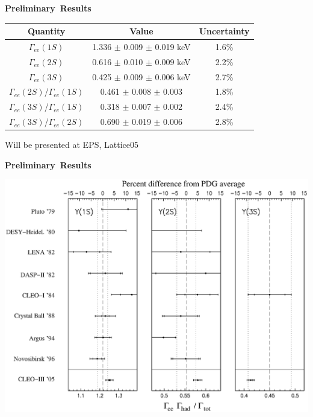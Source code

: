 \documentclass[landscape]{article}
\newenvironment{slide}[1][ ]{\mbox{\bf #1 } \vfill}{\vfill \mbox{ } \pagebreak}
\begin{document}
\begin{slide}[Preliminary Results]
  \begin{center}
    \renewcommand{\arraystretch}{2}
    \begin{tabular}{c c c}
      Quantity & Value & \mbox{\hspace{0.5 cm}} Uncertainty \mbox{\hspace{0.5 cm}} \\ \hline
      $\Gamma_{ee}(1S)$ & \mbox{\hspace{0.5 cm}} 1.336 $\pm$ 0.009 $\pm$ 0.019 keV \mbox{\hspace{0.5 cm}} & 1.6\% \\
      $\Gamma_{ee}(2S)$ & 0.616 $\pm$ 0.010 $\pm$ 0.009 keV & 2.2\% \\
      $\Gamma_{ee}(3S)$ & 0.425 $\pm$ 0.009 $\pm$ 0.006 keV & 2.7\% \\ \hline
      $\Gamma_{ee}(2S)$/$\Gamma_{ee}(1S)$ & 0.461 $\pm$ 0.008 $\pm$ 0.003 & 1.8\% \\
      $\Gamma_{ee}(3S)$/$\Gamma_{ee}(1S)$ & 0.318 $\pm$ 0.007 $\pm$ 0.002 & 2.4\% \\
      $\Gamma_{ee}(3S)$/$\Gamma_{ee}(2S)$ & 0.690 $\pm$ 0.019 $\pm$ 0.006 & 2.8\% \\
    \end{tabular}
  \end{center}

  \vfill
  Will be presented at EPS, Lattice05
\end{slide}

\begin{slide}[Preliminary Results]

  \vfill
  \begin{center}
    \includegraphics[width=0.9\linewidth]{pdgplots2}
  \end{center}
\end{slide}
\end{document}
